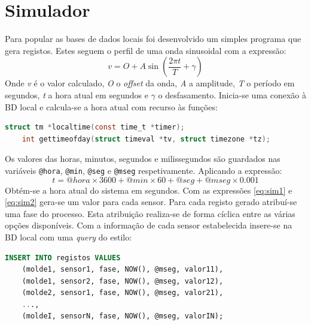 \documentclass[11pt,twoside,a4paper]{report}
\begin{document}
\section{Simulador}
Para popular as bases de dados locais foi desenvolvido um simples programa que gera registos. Estes seguem o perfil de uma onda sinusoidal com a expressão:
\begin{equation}
v = O + A\sin(\frac{2 \pi t}{T} + \gamma)
\label{eq:sim1}
\end{equation}
Onde \textit{v} é o valor calculado, \textit{O} o \textit{offset} da onda, \textit{A} a amplitude, \textit{T} o período em segundos, \textit{t} a hora atual em segundos e $ \gamma $ o desfasamento. Inicia-se uma conexão à BD local e calcula-se a hora atual com recurso às funções:
\begin{lstlisting}[language = C]
	struct tm *localtime(const time_t *timer);
	int gettimeofday(struct timeval *tv, struct timezone *tz);
\end{lstlisting}
Os valores das horas, minutos, segundos e milissegundos são guardados nas variáveis \texttt{@hora}, \texttt{@min}, \texttt{@seg} e \texttt{@mseg} respetivamente. Aplicando a expressão:
\begin{equation}
t = @hora \times 3600 + @min \times 60 + @seg + @mseg \times 0.001
\label{eq:sim2}
\end{equation}
Obtém-se a hora atual do sistema em segundos. Com as expressões \ref{eq:sim1} e \ref{eq:sim2} gera-se um valor para cada sensor. Para cada registo gerado atribuí-se uma fase do processo. Esta atribuição realiza-se de forma cíclica entre as várias opções disponíveis. Com a informação de cada sensor estabelecida insere-se na BD local com uma \textit{query} do estilo:
\begin{lstlisting}[language = SQL]
	INSERT INTO registos VALUES
	(molde1, sensor1, fase, NOW(), @mseg, valor11),
	(molde1, sensor2, fase, NOW(), @mseg, valor12),
	(molde2, sensor1, fase, NOW(), @mseg, valor21),
	...,
	(moldeI, sensorN, fase, NOW(), @mseg, valorIN);
\end{lstlisting}
\end{document}
